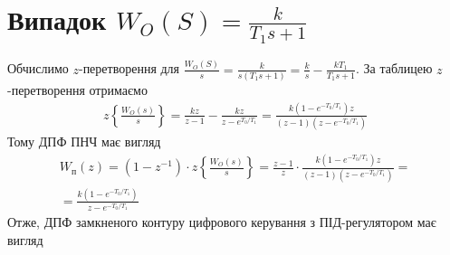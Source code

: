 \section{Випадок \texorpdfstring{$W_O(S) = \frac{k}{T_1 s + 1}$}{1}}
Обчислимо $z$-перетворення для $\frac{W_O(S)}{s} = \frac{k}{s(T_1 s + 1)} = \frac{k}{s} - \frac{k T_1}{T_1 s + 1}$.
За таблицею $z$-перетворення отримаємо
\begin{gather}
    z\left\{\frac{W_O(s)}{s} \right\} = 
    \frac{kz}{z-1} - \frac{kz}{z - e^{T_0 / T_1}} = 
    \frac{k \left(1 - e^{- T_0 / T_1}\right)z}{
        (z-1) \left(z - e^{- T_0 / T_1}\right)
    }
\end{gather}
Тому ДПФ ПНЧ має вигляд
\begin{gather}
    W_{\text{п}}(z) = \left(1 - z^{-1}\right) \cdot z\left\{\frac{W_O(s)}{s} \right\} = 
    \frac{z-1}{z} \cdot \frac{k \left(1 - e^{- T_0 / T_1}\right)z}{
        (z-1) \left(z - e^{- T_0 / T_1}\right)
    } = \nonumber \\ =
    \frac{k \left(1 - e^{- T_0 / T_1}\right)}{
        z - e^{- T_0 / T_1}
    }
\end{gather}
Отже, ДПФ замкненого контуру цифрового керування з ПІД-регулятором має вигляд
